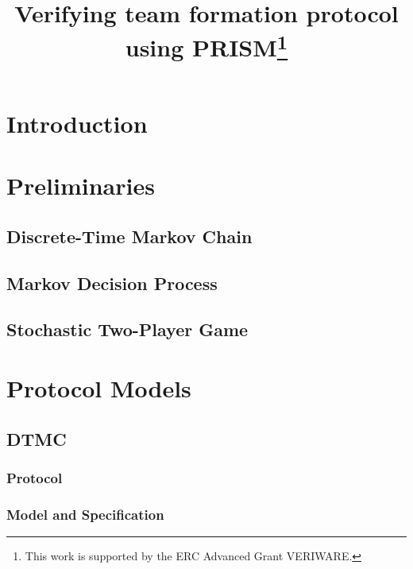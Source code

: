 \documentclass{llncs}
\begin{document}
\title{Verifying team formation protocol using PRISM\thanks{This work is supported by
the ERC Advanced Grant VERIWARE.}}
\author{}
\email{}

\maketitle

\begin{abstract}

\end{abstract}

\section{Introduction}

\section{Preliminaries}

\subsection{Discrete-Time Markov Chain}
\subsection{Markov Decision Process}
\subsection{Stochastic Two-Player Game}

\section{Protocol Models}

\subsection{DTMC}
\subsubsection{Protocol}
\subsubsection{Model and Specification}
\end{document}
